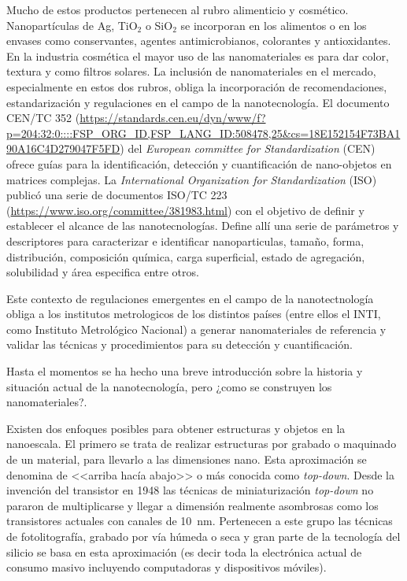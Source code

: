  	Mucho de estos productos pertenecen al rubro alimenticio y cosmético. Nanopartículas de Ag, TiO$_2$ o SiO$_2$ se incorporan en los alimentos o en los envases como conservantes, agentes antimicrobianos, colorantes y antioxidantes. En la industria cosmética el mayor uso de las nanomateriales es para dar color, textura y como filtros solares.
 	La inclusión de nanomateriales en el mercado, especialmente en estos dos rubros, obliga la incorporación de recomendaciones, estandarización y regulaciones en el campo de la nanotecnología.  El documento CEN/TC 352 (\url{https://standards.cen.eu/dyn/www/f?p=204:32:0::::FSP_ORG_ID,FSP_LANG_ID:508478,25&cs=18E152154F73BA190A16C4D279047F5FD}) del \textit{European committee for Standardization} (CEN) ofrece guías para la identificación, detección y cuantificación de nano-objetos en matrices complejas. La \textit{International Organization for Standardization} (ISO) publicó una serie de documentos ISO/TC 223 (\url{https://www.iso.org/committee/381983.html}) con el objetivo de definir y establecer el alcance de las nanotecnologías. Define allí una serie de parámetros y descriptores para caracterizar e identificar nanoparticulas, tamaño, forma, distribución, composición química, carga superficial, estado de agregación, solubilidad y área especifica entre otros.

 	Este contexto de regulaciones emergentes en el campo de la nanotectnología obliga a los institutos metrologicos de los distintos países (entre ellos el INTI, como Instituto Metrológico Nacional) a generar nanomateriales de referencia y validar las técnicas y procedimientos para su detección y cuantificación.

 	Hasta el momentos se ha hecho una breve introducción sobre la historia y situación actual de la nanotecnología, pero ¿como se construyen los nanomateriales?.

	Existen dos enfoques posibles para obtener estructuras y objetos en la nanoescala. El primero se trata de realizar estructuras por grabado o maquinado de un material, para llevarlo a las dimensiones nano. Esta aproximación se denomina de <<arriba hacía abajo>> o más conocida como \textit{top-down}. Desde la invención del transistor en 1948 las técnicas de miniaturización \textit{top-down} no pararon de multiplicarse y llegar a dimensión realmente asombrosas como los transistores actuales con canales de \SI{10}{nm}. Pertenecen a este grupo las técnicas de fotolitografía, grabado por vía húmeda o seca y gran parte de la tecnología del silicio se basa en esta aproximación (es decir toda la electrónica actual de consumo masivo incluyendo computadoras y dispositivos móviles). 

